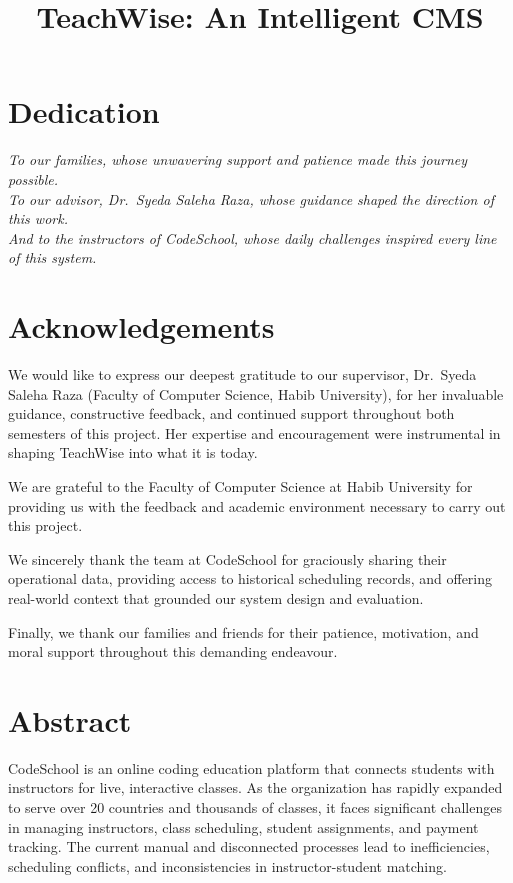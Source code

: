 \documentclass[12pt,twosided]{report}
\title{TeachWise: An Intelligent CMS}
\begin{document}

\chapter*{Dedication}
\textit{To our families, whose unwavering support and patience made this journey possible.}\\[1em]
\textit{To our advisor, Dr.\ Syeda Saleha Raza, whose guidance shaped the direction of this work.}\\[1em]
\textit{And to the instructors of CodeSchool, whose daily challenges inspired every line of this system.}

\chapter*{Acknowledgements}

We would like to express our deepest gratitude to our supervisor, Dr.\ Syeda Saleha Raza (Faculty of Computer Science, Habib University), for her invaluable guidance, constructive feedback, and continued support throughout both semesters of this project. Her expertise and encouragement were instrumental in shaping TeachWise into what it is today.

We are grateful to the Faculty of Computer Science at Habib University for providing us with the feedback and academic environment necessary to carry out this project.

We sincerely thank the team at CodeSchool for graciously sharing their operational data, providing access to historical scheduling records, and offering real-world context that grounded our system design and evaluation.

Finally, we thank our families and friends for their patience, motivation, and moral support throughout this demanding endeavour.

\chapter*{Abstract}

CodeSchool is an online coding education platform that connects students with instructors for live, interactive classes. As the organization has rapidly expanded to serve over 20 countries and thousands of classes, it faces significant challenges in managing instructors, class scheduling, student assignments, and payment tracking. The current manual and disconnected processes lead to inefficiencies, scheduling conflicts, and inconsistencies in instructor-student matching. 
\end{document}
